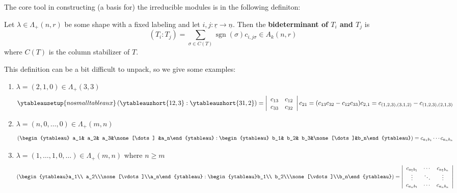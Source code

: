 \documentclass[12pt]{article}
\begin{document}
The core tool in constructing (a basis for) the irreducible modules is in the following definiton:
\begin{defn}
	Let $\lambda\in\Lambda_+(n,r)$ be some shape with a fixed labeling and let $i,j:\underline r\to\underline n$. Then the \textbf{bideterminant of $T_i$ and $T_j$}
	is 
	\[(T_i:T_j)=\sum_{\sigma\in C(T)}\operatorname{sgn}(\sigma)c_{i,j\sigma}\in A_k(n,r)\]
	where $C(T)$ is the column stabilizer of $T$.
\end{defn}
This definition can be a bit difficult to unpack, so we give some examples:
\begin{ex}
	\begin{enumerate}
		\item $\lambda=(2,1,0)\in \Lambda_+(3,3)$\[\ytableausetup{nosmalltableaux}\left(\ytableaushort{1 2,3}:\ytableaushort{3 1,2}\right)=\left|\begin{array}{cc}
			c_{13} & c_{12}\\ c_{33} & c_{32}
		\end{array}\right|c_{21}=(c_{13}c_{32}-c_{12}c_{33})c_{2,1}=c_{(1,2,3),(3,1,2)}-c_{(1,2,3),(2,1,3)}\]
		\item $\lambda=(n,0,\dots,0)\in\Lambda_+(m,n)$\[\left(\begin{ytableau} a_1& a_2& a_3&\none[\dots] &a_n\end{ytableau}:
		\begin{ytableau} b_1& b_2& b_3&\none[\dots]&b_n\end{ytableau}\right)=c_{a_1b_1}\cdots c_{a_nb_n}\]
		\item $\lambda=(1,\dots,1,0,\dots)\in\Lambda_+(m,n)$ where $n\ge m$ \[\left(\begin{ytableau}a_1\\ a_2\\\none[\vdots]\\a_n\end{ytableau}:\begin{ytableau}b_1\\ b_2\\\none[\vdots]\\b_n\end{ytableau}\right)=
			\left|\begin{array}{ccc}c_{a_1b_1} & \cdots & c_{a_1b_n}\\
			\vdots & \ddots & \vdots\\
			c_{a_nb_1} & \cdots & c_{a_nb_n}
			\end{array}\right|\]
	\end{enumerate}
\end{ex}
\end{document}
